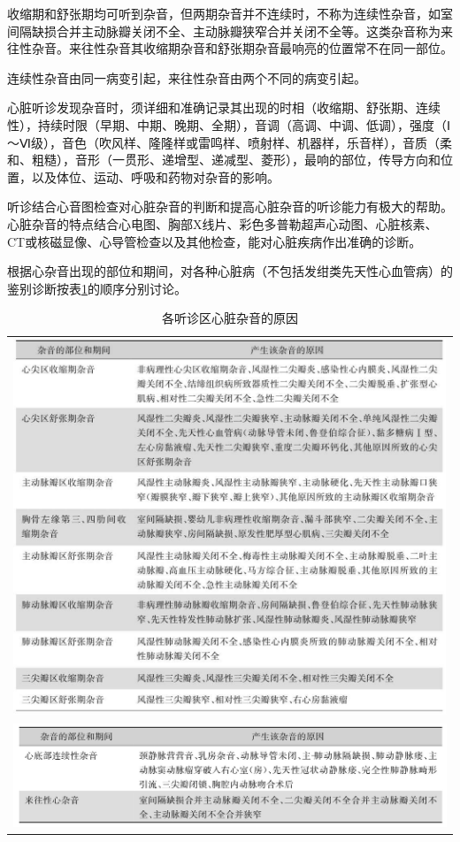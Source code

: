 收缩期和舒张期均可听到杂音，但两期杂音并不连续时，不称为连续性杂音，如室间隔缺损合并主动脉瓣关闭不全、主动脉瓣狭窄合并关闭不全等。这类杂音称为来往性杂音。来往性杂音其收缩期杂音和舒张期杂音最响亮的位置常不在同一部位。

连续性杂音由同一病变引起，来往性杂音由两个不同的病变引起。

心脏听诊发现杂音时，须详细和准确记录其出现的时相（收缩期、舒张期、连续性），持续时限（早期、中期、晚期、全期），音调（高调、中调、低调），强度（Ⅰ～Ⅵ级），音色（吹风样、隆隆样或雷鸣样、喷射样、机器样，乐音样），音质（柔和、粗糙），音形（一贯形、递增型、递减型、菱形），最响的部位，传导方向和位置，以及体位、运动、呼吸和药物对杂音的影响。

听诊结合心音图检查对心脏杂音的判断和提高心脏杂音的听诊能力有极大的帮助。心脏杂音的特点结合心电图、胸部X线片、彩色多普勒超声心动图、心脏核素、CT或核磁显像、心导管检查以及其他检查，能对心脏疾病作出准确的诊断。

根据心杂音出现的部位和期间，对各种心脏病（不包括发绀类先天性心血管病）的鉴别诊断按表\ref{tab15-1}的顺序分别讨论。

\begin{longtable}{c}
 \caption{各听诊区心脏杂音的原因}
 \label{tab15-1}
 \endfirsthead
 \caption[]{各听诊区心脏杂音的原因}
 \endhead
 \includegraphics[width=\textwidth,height=\textheight,keepaspectratio]{./images/Image00096.jpg}\\
 \includegraphics[width=\textwidth,height=\textheight,keepaspectratio]{./images/Image00097.jpg}
 \end{longtable}

